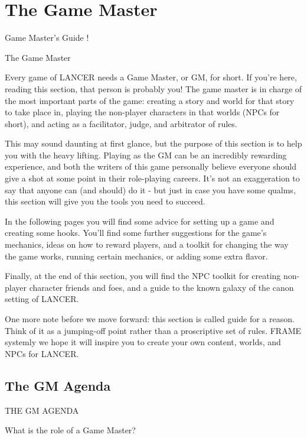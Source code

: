 \part{The Game Master}
Game Master’s Guide 
!                                                                                                         
 

The Game Master  

Every game of LANCER needs a Game Master, or GM, for short. If you’re here, reading this  
section, that person is probably you! The game master is in charge of the most important parts of  
the game: creating a story and world for that story to take place in, playing the non-player  
characters in that worlds (NPCs for short), and acting as a facilitator, judge, and arbitrator of  
rules.
 

This may sound daunting at first glance, but the purpose of this section is to help you with the  
heavy lifting. Playing as the GM can be an incredibly rewarding experience, and both the writers  
of this game personally believe everyone should give a shot at some point in their role-playing  
careers. It’s not an exaggeration to say that anyone can (and should) do it - but just in case you  
have some qualms, this section will give you the tools you need to succeed.
 

In the following pages you will find some advice for setting up a game and creating some  
hooks. You’ll find some further suggestions for the game’s mechanics, ideas on how to reward  
players, and a toolkit for changing the way the game works, running certain mechanics, or  
adding some extra flavor.
 

Finally, at the end of this section, you will find the NPC toolkit for creating non-player character  
friends and foes, and a guide to the known galaxy of the canon setting of LANCER.
 

One more note before we move forward: this section is called guide for a reason. Think of it as a  
jumping-off point rather than a proscriptive set of rules. FRAME systemly we hope it will inspire  
you to create your own content, worlds, and NPCs for LANCER.  

\chapter{The GM Agenda}
                                         THE GM AGENDA  

What is the role of a Game Master?
 

